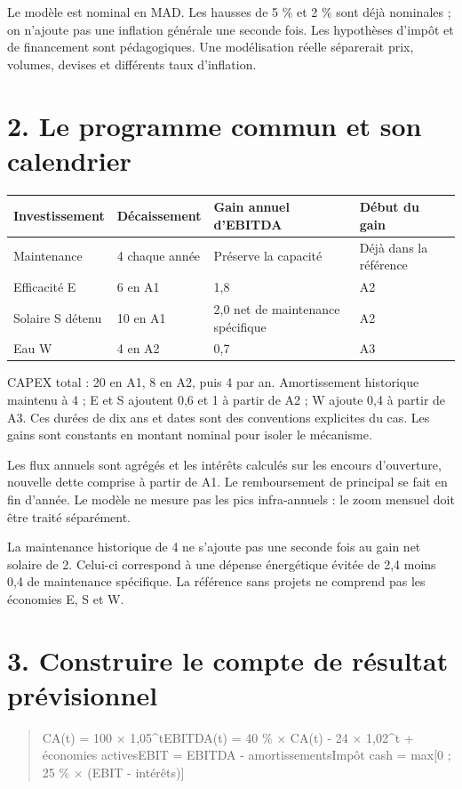 \documentclass[12pt,a4paper]{article}
\begin{document}
Le modèle est nominal en MAD. Les hausses de 5 \% et 2 \% sont déjà nominales ; on n’ajoute pas une inflation générale une seconde fois. Les hypothèses d’impôt et de financement sont pédagogiques. Une modélisation réelle séparerait prix, volumes, devises et différents taux d’inflation.

\section*{2. Le programme commun et son calendrier}

\Needspace{215pt}
\begin{longtable}{p{3.67cm}p{3.67cm}p{3.67cm}p{3.67cm}}
\toprule
Investissement & Décaissement & Gain annuel d’EBITDA & Début du gain \\
\midrule\endhead
Maintenance & 4 chaque année & Préserve la capacité & Déjà dans la référence \\
Efficacité E & 6 en A1 & 1,8 & A2 \\
Solaire S détenu & 10 en A1 & 2,0 net de maintenance spécifique & A2 \\
Eau W & 4 en A2 & 0,7 & A3 \\
\bottomrule
\end{longtable}

CAPEX total : 20 en A1, 8 en A2, puis 4 par an. Amortissement historique maintenu à 4 ; E et S ajoutent 0,6 et 1 à partir de A2 ; W ajoute 0,4 à partir de A3. Ces durées de dix ans et dates sont des conventions explicites du cas. Les gains sont constants en montant nominal pour isoler le mécanisme.


Les flux annuels sont agrégés et les intérêts calculés sur les encours d’ouverture, nouvelle dette comprise à partir de A1. Le remboursement de principal se fait en fin d’année. Le modèle ne mesure pas les pics infra-annuels : le zoom mensuel doit être traité séparément.


La maintenance historique de 4 ne s’ajoute pas une seconde fois au gain net solaire de 2. Celui-ci correspond à une dépense énergétique évitée de 2,4 moins 0,4 de maintenance spécifique. La référence sans projets ne comprend pas les économies E, S et W.

\section*{3. Construire le compte de résultat prévisionnel}

\begin{quote}\small CA(t) = 100 $\times$ 1,05\textasciicircum{}t\newline EBITDA(t) = 40 \% $\times$ CA(t) - 24 $\times$ 1,02\textasciicircum{}t + économies actives\newline EBIT = EBITDA - amortissements\newline Impôt cash = max[0 ; 25 \% $\times$ (EBIT - intérêts)]\end{quote}
\end{document}

